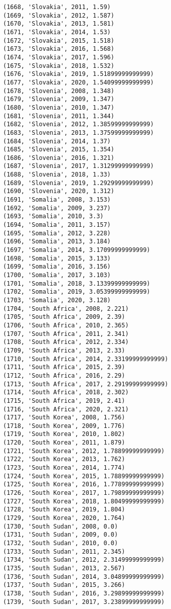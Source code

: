 \documentclass[11pt]{article}
\begin{document}
\begin{Verbatim}[commandchars=\\\{\}]
(1668, 'Slovakia', 2011, 1.59)
(1669, 'Slovakia', 2012, 1.587)
(1670, 'Slovakia', 2013, 1.581)
(1671, 'Slovakia', 2014, 1.53)
(1672, 'Slovakia', 2015, 1.518)
(1673, 'Slovakia', 2016, 1.568)
(1674, 'Slovakia', 2017, 1.596)
(1675, 'Slovakia', 2018, 1.532)
(1676, 'Slovakia', 2019, 1.51899999999999)
(1677, 'Slovakia', 2020, 1.54099999999999)
(1678, 'Slovenia', 2008, 1.348)
(1679, 'Slovenia', 2009, 1.347)
(1680, 'Slovenia', 2010, 1.347)
(1681, 'Slovenia', 2011, 1.344)
(1682, 'Slovenia', 2012, 1.38599999999999)
(1683, 'Slovenia', 2013, 1.37599999999999)
(1684, 'Slovenia', 2014, 1.37)
(1685, 'Slovenia', 2015, 1.354)
(1686, 'Slovenia', 2016, 1.321)
(1687, 'Slovenia', 2017, 1.31299999999999)
(1688, 'Slovenia', 2018, 1.33)
(1689, 'Slovenia', 2019, 1.29299999999999)
(1690, 'Slovenia', 2020, 1.312)
(1691, 'Somalia', 2008, 3.153)
(1692, 'Somalia', 2009, 3.237)
(1693, 'Somalia', 2010, 3.3)
(1694, 'Somalia', 2011, 3.157)
(1695, 'Somalia', 2012, 3.228)
(1696, 'Somalia', 2013, 3.184)
(1697, 'Somalia', 2014, 3.17099999999999)
(1698, 'Somalia', 2015, 3.133)
(1699, 'Somalia', 2016, 3.156)
(1700, 'Somalia', 2017, 3.103)
(1701, 'Somalia', 2018, 3.13399999999999)
(1702, 'Somalia', 2019, 3.05399999999999)
(1703, 'Somalia', 2020, 3.128)
(1704, 'South Africa', 2008, 2.221)
(1705, 'South Africa', 2009, 2.39)
(1706, 'South Africa', 2010, 2.365)
(1707, 'South Africa', 2011, 2.341)
(1708, 'South Africa', 2012, 2.334)
(1709, 'South Africa', 2013, 2.33)
(1710, 'South Africa', 2014, 2.33199999999999)
(1711, 'South Africa', 2015, 2.39)
(1712, 'South Africa', 2016, 2.29)
(1713, 'South Africa', 2017, 2.29199999999999)
(1714, 'South Africa', 2018, 2.302)
(1715, 'South Africa', 2019, 2.41)
(1716, 'South Africa', 2020, 2.321)
(1717, 'South Korea', 2008, 1.756)
(1718, 'South Korea', 2009, 1.776)
(1719, 'South Korea', 2010, 1.802)
(1720, 'South Korea', 2011, 1.879)
(1721, 'South Korea', 2012, 1.78899999999999)
(1722, 'South Korea', 2013, 1.762)
(1723, 'South Korea', 2014, 1.774)
(1724, 'South Korea', 2015, 1.78899999999999)
(1725, 'South Korea', 2016, 1.77899999999999)
(1726, 'South Korea', 2017, 1.79899999999999)
(1727, 'South Korea', 2018, 1.80499999999999)
(1728, 'South Korea', 2019, 1.804)
(1729, 'South Korea', 2020, 1.764)
(1730, 'South Sudan', 2008, 0.0)
(1731, 'South Sudan', 2009, 0.0)
(1732, 'South Sudan', 2010, 0.0)
(1733, 'South Sudan', 2011, 2.345)
(1734, 'South Sudan', 2012, 2.31499999999999)
(1735, 'South Sudan', 2013, 2.567)
(1736, 'South Sudan', 2014, 3.04899999999999)
(1737, 'South Sudan', 2015, 3.266)
(1738, 'South Sudan', 2016, 3.29899999999999)
(1739, 'South Sudan', 2017, 3.23899999999999)

\end{Verbatim}
\end{document}
